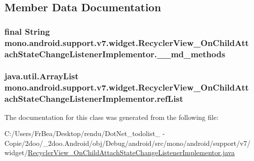 \subsection{Member Data Documentation}
\hypertarget{classmono_1_1android_1_1support_1_1v7_1_1widget_1_1_recycler_view___on_child_attach_state_change_listener_implementor_aa15da75df7533f4e3467fa457218139}{
\subsubsection[{\_\-\_\-md\_\-methods}]{\setlength{\rightskip}{0pt plus 5cm}final String {\bf mono.android.support.v7.widget.RecyclerView\_\-OnChildAttachStateChangeListenerImplementor.\_\-\_\-md\_\-methods}}}
\label{classmono_1_1android_1_1support_1_1v7_1_1widget_1_1_recycler_view___on_child_attach_state_change_listener_implementor_aa15da75df7533f4e3467fa457218139}


\hypertarget{classmono_1_1android_1_1support_1_1v7_1_1widget_1_1_recycler_view___on_child_attach_state_change_listener_implementor_e6e21c96d1a382ab9e0af61a3598e6a5}{
\subsubsection[{refList}]{\setlength{\rightskip}{0pt plus 5cm}java.util.ArrayList {\bf mono.android.support.v7.widget.RecyclerView\_\-OnChildAttachStateChangeListenerImplementor.refList}}}
\label{classmono_1_1android_1_1support_1_1v7_1_1widget_1_1_recycler_view___on_child_attach_state_change_listener_implementor_e6e21c96d1a382ab9e0af61a3598e6a5}




The documentation for this class was generated from the following file:\begin{CompactItemize}
\item 
C:/Users/FrBea/Desktop/rendu/DotNet\_\-todolist\_ - Copie/2doo/\_\-2doo.Android/obj/Debug/android/src/mono/android/support/v7/widget/\hyperlink{_recycler_view___on_child_attach_state_change_listener_implementor_8java}{RecyclerView\_\-OnChildAttachStateChangeListenerImplementor.java}\end{CompactItemize}
